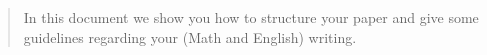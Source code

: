 \begin{abstract}
    In this document we show you how to structure your paper and give some guidelines regarding
    your (Math and English) writing.
\end{abstract}